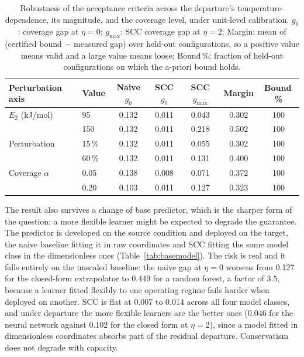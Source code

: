 \documentclass[review,times]{elsarticle}
\theoremstyle{definition}
\theoremstyle{remark}
\begin{document}
\begin{table}[t]\centering\footnotesize
\setlength{\tabcolsep}{9pt}\renewcommand{\arraystretch}{1.2}
\caption{Robustness of the acceptance criteria across the departure's temperature-dependence, its
magnitude, and the coverage level, under unit-level calibration. $g_0$: coverage gap at $\eta=0$;
$g_{\max}$: SCC coverage gap at $\eta=2$; Margin: mean of (certified bound $-$ measured gap) over
held-out configurations, so a positive value means valid and a large value means loose; Bound\,\%:
fraction of held-out configurations on which the a-priori bound holds.}\label{tab:robust}
\begin{tabular}{@{}llccccc@{}}\toprule
Perturbation axis & Value & Naive $g_0$ & SCC $g_0$ & SCC $g_{\max}$ & Margin & Bound\,\% \\\midrule
$E_2$ (kJ/mol) & 95   & 0.132 & 0.011 & 0.043 & 0.302 & 100 \\
               & 150  & 0.132 & 0.011 & 0.218 & 0.502 & 100 \\
Perturbation   & 15\,\% & 0.132 & 0.011 & 0.055 & 0.302 & 100 \\
               & 60\,\% & 0.132 & 0.011 & 0.131 & 0.400 & 100 \\
Coverage $\alpha$ & 0.05 & 0.138 & 0.008 & 0.071 & 0.372 & 100 \\
               & 0.20 & 0.103 & 0.011 & 0.127 & 0.323 & 100 \\\bottomrule
\end{tabular}
\end{table}

The result also survives a change of base predictor, which is the sharper form of the question:
a more flexible learner might be expected to degrade the guarantee. The predictor is developed on
the source condition and deployed on the target, the naive baseline fitting it in raw coordinates
and SCC fitting the same model class in the dimensionless ones
(Table~\ref{tab:basemodel}). The risk is real and it falls entirely on the unscaled baseline: the
naive gap at $\eta=0$ worsens from 0.127 for the closed-form extrapolator to 0.449 for a random
forest, a factor of $3.5$, because a learner fitted flexibly to one operating regime fails harder
when deployed on another. SCC is flat at 0.007 to 0.014 across all four model classes, and under
departure the more flexible learners are the better ones (0.046 for the neural network against
0.102 for the closed form at $\eta=2$), since a model fitted in dimensionless coordinates absorbs
part of the residual departure. Conservatism does not degrade with capacity.
\end{document}
